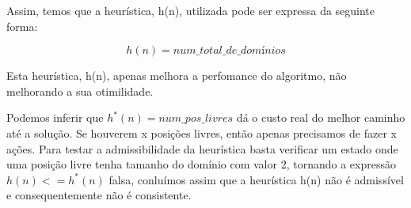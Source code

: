 \documentclass[12pt,a4paper]{article}
\begin{document}
  Assim, temos que a heurística, h(n), utilizada pode ser expressa da seguinte forma:
  
  $$
  h(n) = num\_total\_de\_domínios
  $$

  
  Esta heurística, h(n), apenas melhora a perfomance do algoritmo, não melhorando a sua otimilidade.

  Podemos inferir que $h^*(n) = num\_pos\_livres$ dá o custo real do melhor caminho até a solução. Se houverem x posições livres, então apenas precisamos de fazer x ações.
  Para testar a admissibilidade da heurística basta verificar um estado onde uma posição livre tenha tamanho do domínio com valor 2, tornando a expressão $h(n) <= h^*(n)$ falsa,
  conluímos assim que a heurística h(n) não é admissível e consequentemente não é consistente.
\end{document}
